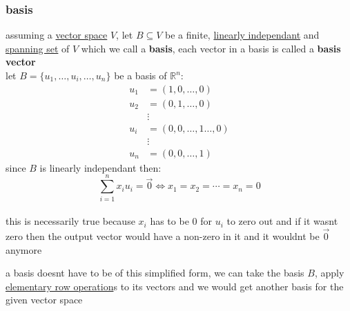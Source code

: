 \documentclass[a4paper,12pt]{article}
\begin{document}
\subsubsection{basis}
\label{sec:orgfcbaa89}
\begin{definition}
assuming a \hyperref[sec:orgea93933]{vector space} \(V\), let \(B \subseteq V\) be a finite, \hyperref[sec:org174d95a]{linearly independant} and \hyperref[sec:org780ffb0]{spanning set} of \(V\) which we call a \textbf{basis}, each vector in a basis is called a \textbf{basis vector}\\
let \(B = \{u_1,\ldots,u_i,\ldots,u_n\}\) be a basis of \(\mathbb{R}^n\):\\
\begin{align*}
  u_1 &= (1,0,\ldots,0)\\
  u_2 &= (0,1,\ldots,0)\\
  &\vdots\\
  u_i &= (0,0,\ldots,1\ldots,0)\\
  &\vdots\\
  u_n &= (0,0,\ldots,1)
\end{align*}
since \(B\) is linearly independant then:\\
\[
  \sum_{i=1}^{n} x_iu_i = \vec0 \iff x_1 = x_2 = \cdots = x_n = 0
\]\\
this is necessarily true because \(x_i\) has to be 0 for \(u_i\) to zero out and if it wasnt zero then the output vector would have a non-zero in it and it wouldnt be \(\vec0\) anymore\\
\begin{note}
a basis doesnt have to be of this simplified form, we can take the basis \(B\), apply \hyperref[sec:orgdd80885]{elementary row operation}s to its vectors and we would get another basis for the given vector space\\
\end{note}


\end{definition}
\end{document}
